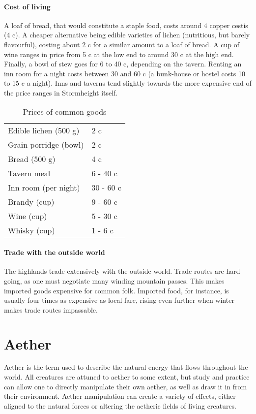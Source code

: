 \documentclass[a4paper,11pt,oneside]{book}
\begin{document}
\subsubsection{Cost of living}
A loaf of bread, that would constitute a staple food, costs around 4 copper cestis (4 c). A cheaper alternative being edible varieties of lichen (nutritious, but barely flavourful), costing about 2 c for a similar amount to a loaf of bread. A cup of wine ranges in price from 5 c at the low end to around 30 c at the high end. Finally, a bowl of stew goes for 6 to 40 c, depending on the tavern. Renting an inn room for a night costs between 30 and 60 c (a bunk-house or hostel costs 10 to 15 c a night). Inns and taverns tend slightly towards the more expensive end of the price ranges in Stormheight itself.  

\begin{table}[ht!]
	\centering
	\begin{tabular}{|l|l|}
		\hline
		Edible lichen (500 g)  & 2 c\\
		Grain porridge (bowl) & 2 c \\ 
		Bread (500 g) & 4 c \\
		Tavern meal & 6 - 40 c \\
		Inn room (per night) & 30 - 60 c \\
		Brandy (cup) & 9 - 60 c \\
		Wine (cup) & 5 - 30 c \\
		Whisky (cup) & 1 - 6 c \\
		\hline		
	\end{tabular}
\caption{Prices of common goods}
\end{table}

\subsubsection{Trade with the outside world}
The highlands trade extensively with the outside world. Trade routes are hard going, as one must negotiate many winding mountain passes. This makes imported goods expensive for common folk. Imported food, for instance, is usually four times as expensive as local fare, rising even further when winter makes trade routes impassable. 

  



\chapter{Aether}
Aether is the term used to describe the natural energy that flows throughout the world. All creatures are attuned to aether to some extent, but study and practice can allow one to directly manipulate their own aether, as well as draw it in from their environment. Aether manipulation can create a variety of effects, either aligned to the natural forces or altering the aetheric fields of living creatures.
\end{document}
